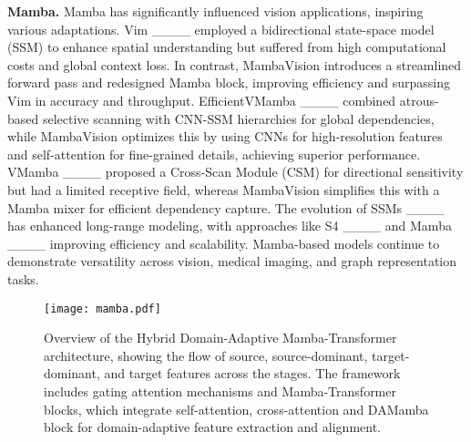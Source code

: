 \textbf{Mamba.} Mamba has significantly influenced vision applications, inspiring various adaptations. Vim ____ employed a bidirectional state-space model (SSM) to enhance spatial understanding but suffered from high computational costs and global context loss. In contrast, MambaVision introduces a streamlined forward pass and redesigned Mamba block, improving efficiency and surpassing Vim in accuracy and throughput. EfficientVMamba ____ combined atrous-based selective scanning with CNN-SSM hierarchies for global dependencies, while MambaVision optimizes this by using CNNs for high-resolution features and self-attention for fine-grained details, achieving superior performance. VMamba ____ proposed a Cross-Scan Module (CSM) for directional sensitivity but had a limited receptive field, whereas MambaVision simplifies this with a Mamba mixer for efficient dependency capture. The evolution of SSMs ____ has enhanced long-range modeling, with approaches like S4 ____ and Mamba ____ improving efficiency and scalability. Mamba-based models continue to demonstrate versatility across vision, medical imaging, and graph representation tasks.


\begin{figure*}[!t]
\centering
\texttt{[image: mamba.pdf]}
\caption{Overview of the Hybrid Domain-Adaptive Mamba-Transformer architecture, showing the flow of source, source-dominant, target-dominant, and target features across the stages. The framework includes gating attention mechanisms and Mamba-Transformer blocks, which integrate self-attention, cross-attention and DAMamba block for domain-adaptive feature extraction and alignment.}
\label{fig:mamba}
\end{figure*}